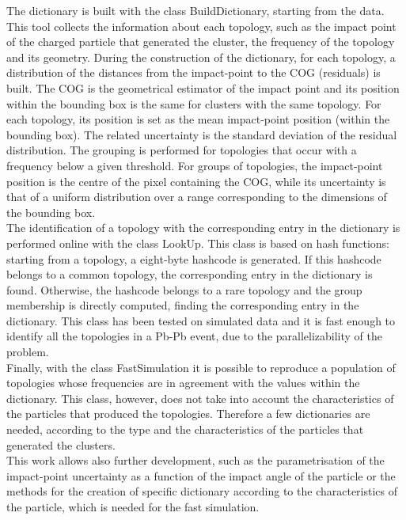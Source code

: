 The dictionary is built with the class BuildDictionary, starting from the data. This tool collects the information about each topology, such as the impact point of the charged particle that generated the cluster, the frequency of the topology and its geometry. During the construction of the dictionary, for each topology, a distribution of the distances from the impact-point to the COG (residuals) is built. The COG is the geometrical estimator of the impact point and its position within the bounding box is the same for clusters with the same topology. For each topology, its position is set as the mean impact-point position (within the bounding box). The related uncertainty is the standard deviation of the residual distribution. The grouping is performed for topologies that occur with a frequency below a given threshold. For groups of topologies, the impact-point position is the centre of the pixel containing the COG, while its uncertainty is that of a uniform distribution over a range corresponding to the dimensions of the bounding box.\\
The identification of a topology with the corresponding entry in the dictionary is performed online with the class LookUp. This class is based on hash functions: starting from a topology, a eight-byte hashcode is generated. If this hashcode belongs to a common topology, the corresponding entry in the dictionary is found. Otherwise, the hashcode belongs to a rare topology and the group membership is directly computed, finding the corresponding entry in the dictionary. This class has been tested on simulated data and it is fast enough to identify all the topologies in a Pb-Pb event, due to the parallelizability of the problem.\\
Finally, with the class FastSimulation it is possible to reproduce a population of topologies whose frequencies are in agreement with the values within the dictionary. This class, however, does not take into account the characteristics of the particles that produced the topologies. Therefore a few dictionaries are needed, according to the type and the characteristics of the particles that generated the clusters.\\
This work allows also further development, such as the parametrisation of the impact-point uncertainty as a function of the impact angle of the particle or the methods for the creation of specific dictionary according to the characteristics of the particle, which is needed for the fast simulation.